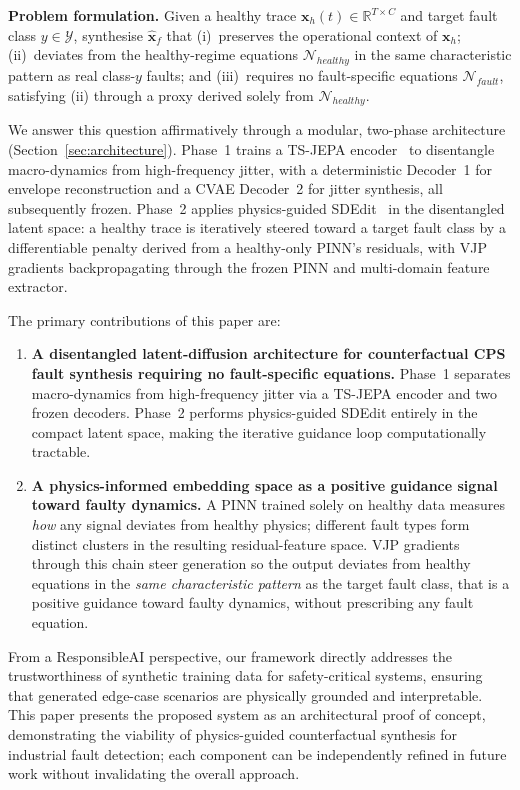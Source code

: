 \documentclass[conference]{IEEEtran}
\newcommand{\x}{\mathbf{x}}
\begin{document}
\textbf{Problem formulation.} Given a healthy trace
$\x_{h}(t)\!\in\!\mathbb{R}^{T\times C}$ and target fault class $y\!\in\!\mathcal{Y}$, synthesise $\hat{\x}_{f}$ that (i)~preserves the operational context of $\x_h$; (ii)~deviates from the healthy-regime equations $\mathcal{N}_{healthy}$ in the same characteristic pattern as real class-$y$ faults; and (iii)~requires no fault-specific equations $\mathcal{N}_{fault}$, satisfying (ii) through a proxy derived solely from $\mathcal{N}_{healthy}$.

We answer this question affirmatively through a modular, two-phase architecture (Section~\ref{sec:architecture}). Phase~1 trains a TS-JEPA encoder~\cite{jepa2024} to disentangle macro-dynamics from high-frequency jitter, with a deterministic Decoder~1 for envelope reconstruction and a CVAE Decoder~2 for jitter synthesis, all subsequently frozen. Phase~2 applies physics-guided SDEdit~\cite{sdedit2021} in the disentangled latent space: a healthy trace is iteratively steered toward a target fault class by a differentiable penalty derived from a healthy-only PINN's residuals, with VJP gradients backpropagating through the frozen PINN and multi-domain feature extractor.

The primary contributions of this paper are:
\begin{enumerate}
  \item \textbf{A disentangled latent-diffusion architecture for counterfactual CPS fault synthesis requiring no fault-specific equations.} Phase~1 separates macro-dynamics from high-frequency jitter via a TS-JEPA encoder and two frozen decoders. Phase~2 performs physics-guided SDEdit entirely in the compact latent space, making the iterative guidance loop computationally tractable.
  \item \textbf{A physics-informed embedding space as a positive guidance signal toward faulty dynamics.} A PINN trained solely on healthy data measures \emph{how} any signal deviates from healthy physics; different fault types form distinct clusters in the resulting residual-feature space. VJP gradients through this chain steer generation so the output deviates from healthy equations in the \emph{same characteristic pattern} as the target fault class, that is a positive guidance toward faulty dynamics, without prescribing any fault equation.
\end{enumerate}

From a ResponsibleAI perspective, our framework directly addresses the trustworthiness of synthetic training data for safety-critical systems, ensuring that generated edge-case scenarios are physically grounded and interpretable. This paper presents the proposed system as an architectural proof of concept, demonstrating the viability of physics-guided counterfactual synthesis for industrial fault detection; each component can be independently refined in future work without invalidating the overall approach.
\end{document}
